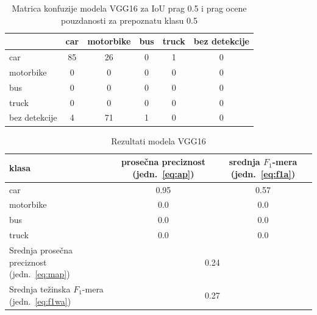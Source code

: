 \documentclass[12pt,oneside]{memoir}
\begin{document}
\begin{table}[h!]
    \begin{center}
    \caption{Matrica konfuzije modela VGG16 za IoU prag 0.5 i prag ocene pouzdanosti za prepoznatu klasu 0.5}
    \begin{tabular}{ l|c|c|c|c|c|}
                  & car  & motorbike & bus & truck & bez detekcije \\ \hline
    car           & 85   & 26        & 0   & 1     & 0             \\ 
    motorbike     & 0    & 0         & 0   & 0     & 0             \\ 
    bus           & 0    & 0         & 0   & 0     & 0             \\ 
    truck         & 0    & 0         & 0   & 0     & 0             \\ 
    bez detekcije & 4    & 71        & 1   & 0     & 0             \\ \hline
    \hline
    \end{tabular}
    \label{tab:section4_vgg16_confusionmatrix}
    \end{center}
\end{table}


\begin{table}[h!]
    \begin{center}
    \caption{Rezultati modela VGG16}
    \begin{tabular}{|m{10em}|c|c|}
        \toprule
        klasa     & prosečna preciznost (jedn.~\ref{eq:ap}) & srednja $F_1$-mera (jedn.~\ref{eq:f1a})  \\ \hline
        \midrule
        car       & 0.95  & 0.57 \\ \hline
        motorbike & 0.0   & 0.0 \\ \hline
        bus       & 0.0   & 0.0 \\ \hline
        truck     & 0.0   & 0.0 \\ \hline
        \bottomrule
        Srednja prosečna preciznost (jedn.~\ref{eq:map}) & \multicolumn{2}{c|}{0.24}  \\ \hline
        Srednja težinska $F_1$-mera (jedn.~\ref{eq:f1wa}) & \multicolumn{2}{c|}{0.27}  \\ \hline
    \end{tabular}
    \label{tab:section4_vgg16_results}
    \end{center}
\end{table}
\end{document}

